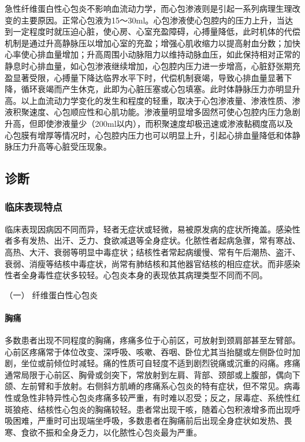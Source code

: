 急性纤维蛋白性心包炎不影响血流动力学，而心包渗液则是引起一系列病理生理改变的主要原因。正常心包液为15～30ml。心包渗液使心包腔内的压力上升，当达到一定程度时就压迫心脏，使心房、心室充盈障碍，心搏量降低，此时机体的代偿机制是通过升高静脉压以增加心室的充盈；增强心肌收缩力以提高射血分数；加快心率使心排血量增加；升高周围小动脉阻力以维持动脉血压，如此保持相对正常的静息时心排血量，如心包渗液继续增加，心包腔内压力进一步增高，心脏舒张期充盈显著受限，心搏量下降达临界水平下时，代偿机制衰竭，导致心排血量显著下降，循环衰竭而产生休克，此即为心脏压塞或心包填塞。此时体静脉压力亦明显升高。以上血流动力学变化的发生和程度的轻重，取决于心包渗液量、渗液性质、渗液积聚速度、心包顺应性和心肌功能。渗液量明显增多固然可使心包腔内压力急剧升高，但即使渗液量少（200ml以内），而积聚速度却极迅速或渗液黏稠度高以及心包膜有增厚等情况时，心包腔内压力也可以明显上升，引起心排血量降低和体静脉压力升高等心脏受压现象。

\subsection{诊断}

\subsubsection{临床表现特点}

临床表现因病因不同而异，轻者无症状或轻微，易被原发病的症状所掩盖。感染性者多有发热、出汗、乏力、食欲减退等全身症状。化脓性者起病急骤，常有寒战、高热、大汗、衰弱等明显中毒症状；结核性者常起病缓慢、常有午后潮热、盗汗、衰弱、消瘦等结核中毒症状，尚常有肺结核和其他器官结核的相应症状。而非感染性者全身毒性症状多较轻。心包炎本身的表现依其病理类型不同而不同。

\hypertarget{text00302.htmlux5cux23CHP10-4-2-1-1}{}
（一） 纤维蛋白性心包炎

\paragraph{胸痛}

多数患者出现不同程度的胸痛，疼痛多位于心前区，可放射到颈肩部甚至左臂部。心前区疼痛常于体位改变、深呼吸、咳嗽、吞咽、卧位尤其当抬腿或左侧卧位时加剧，坐位或前倾位时减轻。痛的性质可自轻度不适到剧烈锐痛或沉重的闷痛。疼痛通常局限于心前区、胸骨或剑突下，常放射到左肩、背部、颈部或上腹部，偶向下颌、左前臂和手放射。右侧斜方肌嵴的疼痛系心包炎的特有症状，但不常见。病毒性或急性非特异性心包炎疼痛多较严重，有时难以忍受；反之，尿毒症、系统性红斑狼疮、结核性心包炎的胸痛较轻。患者常出现干咳，随着心包积液增多而出现呼吸困难，严重时可出现端坐呼吸，多数患者在胸痛前后出现全身症状如发热、畏寒、食欲不振和全身乏力，以化脓性心包炎最为严重。


